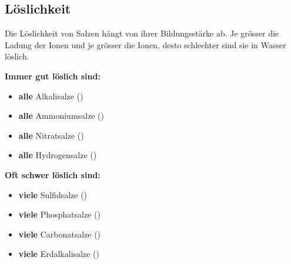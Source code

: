 \subsection{Löslichkeit}
    Die Löslichkeit von Salzen hängt von ihrer Bildungsstärke ab. Je grösser die Ladung der Ionen und je grösser die Ionen, desto schlechter sind sie in Wasser löslich.
    
    \begin{minipage}{0.49\columnwidth}
        \textbf{Immer gut löslich sind:}
        \begin{itemize}
            \item \textbf{alle} Alkalisalze ()
            \item \textbf{alle} Ammoniumsalze ()
            \item \textbf{alle} Nitratsalze ()
            \item \textbf{alle} Hydrogensalze ()
        \end{itemize}
    \end{minipage}
    \hfill
    \begin{minipage}{0.49\columnwidth}
        \textbf{Oft schwer löslich sind:}
        \begin{itemize}
            \item \textbf{viele} Sulfidsalze ()
            \item \textbf{viele} Phosphatsalze ()
            \item \textbf{viele} Carbonatsalze ()
            \item \textbf{viele} Erdalkalisalze ()
        \end{itemize}
    \end{minipage}
    

